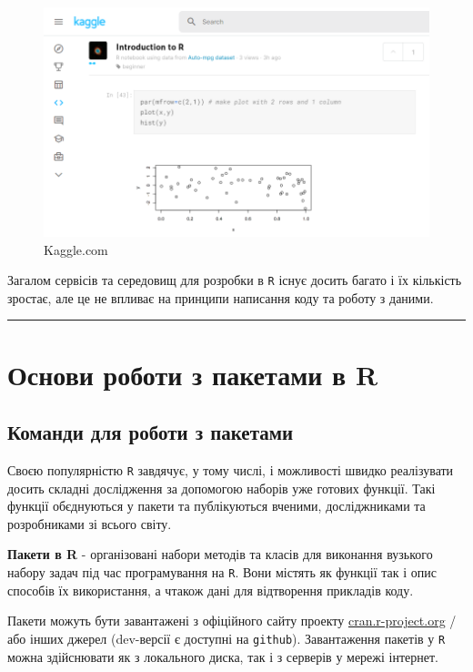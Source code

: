 \documentclass[
]{book}
\begin{document}
\begin{figure}
\centering
\includegraphics{images/chapter1/kaggle.png}
\caption{\label{fig:unnamed-chunk-30}Kaggle.com}
\end{figure}

Загалом сервісів та середовищ для розробки в \texttt{R} існує досить багато і їх кількість зростає, але це не впливає на принципи написання коду та роботу з даними.

\begin{center}\rule{0.5\linewidth}{0.5pt}\end{center}

\hypertarget{chapter14}{%
\section{Основи роботи з пакетами в R}\label{chapter14}}

\hypertarget{chapter141}{%
\subsection{Команди для роботи з пакетами}\label{chapter141}}

Своєю популярністю \texttt{R} завдячує, у тому числі, і можливості швидко реалізувати досить складні дослідження за допомогою наборів уже готових функції. Такі функції обєднуються у пакети та публікуються вченими, досліджниками та розробниками зі всього світу.

\textbf{Пакети в R} - організовані набори методів та класів для виконання вузького набору задач під час програмування на \texttt{R}. Вони містять як функції так і опис способів їх використання, а чтакож дані для відтворення прикладів коду.

Пакети можуть бути завантажені з офіційного сайту проекту \href{https://cran.r-project.org/web/packages/available_packages_by_name.html}{cran.r-project.org} / \citep{R-base} або інших джерел (dev-версії є доступні на \texttt{github}). Завантаження пакетів у \texttt{R} можна здійснювати як з локального диска, так і з серверів у мережі інтернет.
\end{document}
